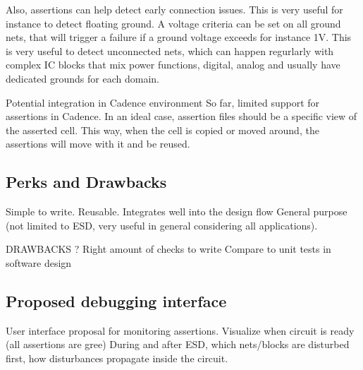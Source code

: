 Also, assertions can help detect early connection issues.
This is very useful for instance to detect floating ground.
A voltage criteria can be set on all ground nets, that will trigger a failure if a ground voltage exceeds for instance 1V.
This is very useful to detect unconnected nets, which can happen regurlarly with complex IC blocks that mix power functions, digital, analog
and usually have dedicated grounds for each domain.

Potential integration in Cadence environment
So far, limited support for assertions in Cadence.
In an ideal case, assertion files should be a specific view of the asserted cell.
This way, when the cell is copied or moved around, the assertions will move with it and be reused.

\subsection{Perks and Drawbacks}

Simple to write.
Reusable.
Integrates well into the design flow
General purpose (not limited to ESD, very useful in general considering all applications).

DRAWBACKS ?
Right amount of checks to write
Compare to unit tests in software design

\subsection{Proposed debugging interface}

User interface proposal for monitoring assertions.
Visualize when circuit is ready (all assertions are gree)
During and after ESD, which nets/blocks are disturbed first, how disturbances propagate inside the circuit.
